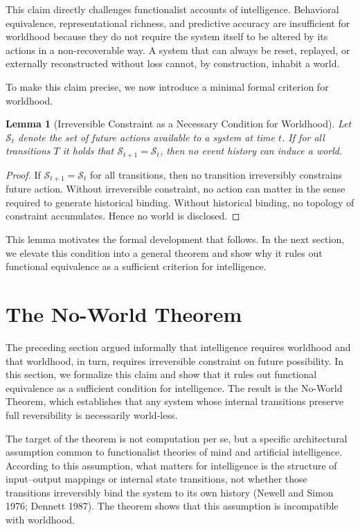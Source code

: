 \documentclass[11pt]{article}
\newtheorem{lemma}{Lemma}
\theoremstyle{remark}
\begin{document}
This claim directly challenges functionalist accounts of intelligence. Behavioral equivalence, representational richness, and predictive accuracy are insufficient for worldhood because they do not require the system itself to be altered by its actions in a non-recoverable way. A system that can always be reset, replayed, or externally reconstructed without loss cannot, by construction, inhabit a world.

To make this claim precise, we now introduce a minimal formal criterion for worldhood.

\begin{lemma}[Irreversible Constraint as a Necessary Condition for Worldhood]
Let $\mathcal{S}_t$ denote the set of future actions available to a system at time $t$. If for all transitions $T$ it holds that $\mathcal{S}_{t+1} = \mathcal{S}_t$, then no event history can induce a world.
\end{lemma}

\begin{proof}
If $\mathcal{S}_{t+1} = \mathcal{S}_t$ for all transitions, then no transition irreversibly constrains future action. Without irreversible constraint, no action can matter in the sense required to generate historical binding. Without historical binding, no topology of constraint accumulates. Hence no world is disclosed.
\end{proof}

This lemma motivates the formal development that follows. In the next section, we elevate this condition into a general theorem and show why it rules out functional equivalence as a sufficient criterion for intelligence.

\section{The No-World Theorem}

The preceding section argued informally that intelligence requires worldhood and that worldhood, in turn, requires irreversible constraint on future possibility. In this section, we formalize this claim and show that it rules out functional equivalence as a sufficient condition for intelligence. The result is the No-World Theorem, which establishes that any system whose internal transitions preserve full reversibility is necessarily world-less.

The target of the theorem is not computation per se, but a specific architectural assumption common to functionalist theories of mind and artificial intelligence. According to this assumption, what matters for intelligence is the structure of input–output mappings or internal state transitions, not whether those transitions irreversibly bind the system to its own history (Newell and Simon 1976; Dennett 1987). The theorem shows that this assumption is incompatible with worldhood.
\end{document}
